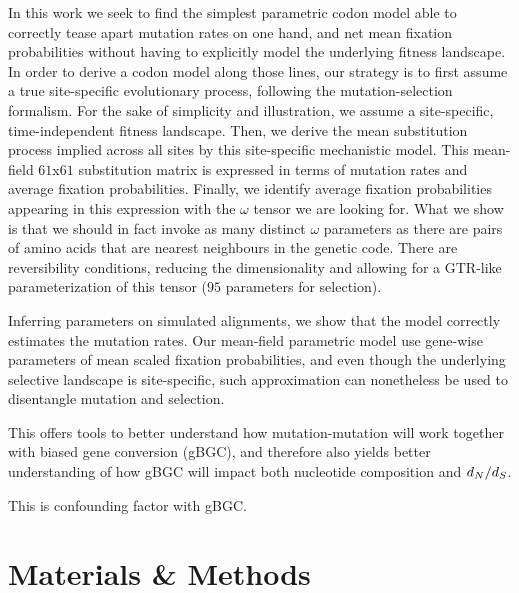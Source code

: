 In this work we seek to find the simplest parametric codon model able to correctly tease apart mutation rates on one hand, and net mean fixation probabilities without having to explicitly model the underlying fitness landscape.
In order to derive a codon model along those lines, our strategy is to first assume a true site-specific evolutionary process, following the mutation-selection formalism.
For the sake of simplicity and illustration, we assume a site-specific, time-independent fitness landscape.
Then, we derive the mean substitution process implied across all sites by this site-specific mechanistic model.
This mean-field $61$x$61$ substitution matrix is expressed in terms of mutation rates and average fixation probabilities.
Finally, we identify average fixation probabilities appearing in this expression with the $\omega$ tensor we are looking for.
What we show is that we should in fact invoke as many distinct $\omega$ parameters as there are pairs of amino acids that are nearest neighbours in the genetic code.
There are reversibility conditions, reducing the dimensionality and allowing for a GTR-like parameterization of this tensor ($95$ parameters for selection).

Inferring parameters on simulated alignments, we show that the model correctly estimates the mutation rates.
Our mean-field parametric model use gene-wise parameters of mean scaled fixation probabilities, and even though the underlying selective landscape is site-specific, such approximation can nonetheless be used to disentangle mutation and selection.

This offers tools to better understand how mutation-mutation will work together with biased gene conversion (\acrshort{gBGC}), and therefore also yields better understanding of how \acrshort{gBGC} will impact both nucleotide composition and $d_N / d_S$.

This is confounding factor with \acrshort{gBGC}.


\section{Materials \& Methods}

